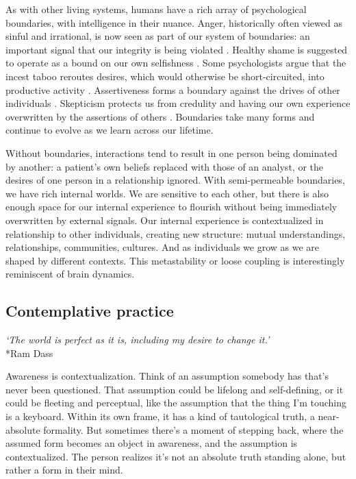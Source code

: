\documentclass[12pt]{article}
\begin{document}
As with other living systems, humans have a rich array of psychological boundaries, with intelligence in their nuance. Anger, historically often viewed as sinful and irrational, is now seen as part of our system of boundaries: an important signal that our integrity is being violated \citep{lerner1985dance, videbeck2010psychiatric, sell2011recalibrational}. Healthy shame is suggested to operate as a bound on our own selfishness \citep{bradshaw1988healing}. Some psychologists argue that the incest taboo reroutes desires, which would otherwise be short-circuited, into productive activity \citep{stein1973incest, levistrauss1949structures, freud1913totem}. Assertiveness forms a boundary against the drives of other individuals \citep{smith1985say}. Skepticism protects us from credulity and having our own experience overwritten by the assertions of others \citep{lewandowsky2012misinformation, sperber2010epistemic}. Boundaries take many forms and continue to evolve as we learn across our lifetime.


Without boundaries, interactions tend to result in one person being dominated by another: a patient's own beliefs replaced with those of an analyst, or the desires of one person in a relationship ignored. With semi-permeable boundaries, we have rich internal worlds. We are sensitive to each other, but there is also enough space for our internal experience to flourish without being immediately overwritten by external signals. Our internal experience is contextualized in relationship to other individuals, creating new structure: mutual understandings, relationships, communities, cultures. And as individuals we grow as we are shaped by different contexts. This metastability or loose coupling is interestingly reminiscent of brain dynamics.


\subsection{Contemplative practice}

\begin{center}
\textit{`The world is perfect as it is, including my desire to change it.'}\\*Ram Dass
\end{center}


Awareness is contextualization. Think of an assumption somebody has that's never been questioned. That assumption could be lifelong and self-defining, or it could be fleeting and perceptual, like the assumption that the thing I'm touching is a keyboard. Within its own frame, it has a kind of tautological truth, a near-absolute formality. But sometimes there's a moment of stepping back, where the assumed form becomes an object in awareness, and the assumption is contextualized. The person realizes it's not an absolute truth standing alone, but rather a form in their mind.
\end{document}
